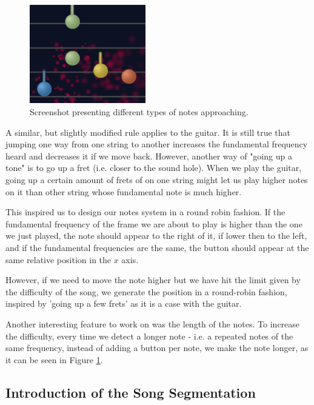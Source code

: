 \begin{figure}
  \begin{center}
    \includegraphics[width=0.45\textwidth]{Figures/NotesComing}
  \end{center}
  \caption{Screenshot presenting different types of notes approaching.}
\label{fig:notetypes}
\end{figure}

A similar, but slightly modified rule applies to the guitar. It is still true that jumping one way from one string to another increases the fundamental frequency heard and decreases it if we move back. However, another way of "going up a tone" is to go up a fret (i.e. closer to the sound hole). When we play the guitar, going up a certain amount of frets of on one string might let us play higher notes on it than other string whose fundamental note is much higher. 

This inspired us to design our notes system in a round robin fashion. If the fundamental frequency of the frame we are about to play is higher than the one we just played, the note should appear to the right of it, if lower then to the left, and if the fundamental frequencies are the same, the button should appear at the same relative position in the $x$ axis. 

However, if we need to move the note higher but we have hit the limit given by the difficulty of the song, we generate the position in a round-robin fashion, inspired by 'going up a few frets' as it is a case with the guitar.

Another interesting feature to work on was the length of the notes. To increase the difficulty, every time we detect a longer note - i.e. a repeated notes of the same frequency, instead of adding a button per note, we make the note longer, as it can be seen in Figure \ref{fig:notetypes}.

\vspace{10pt}

\subsection{Introduction of the Song Segmentation}

